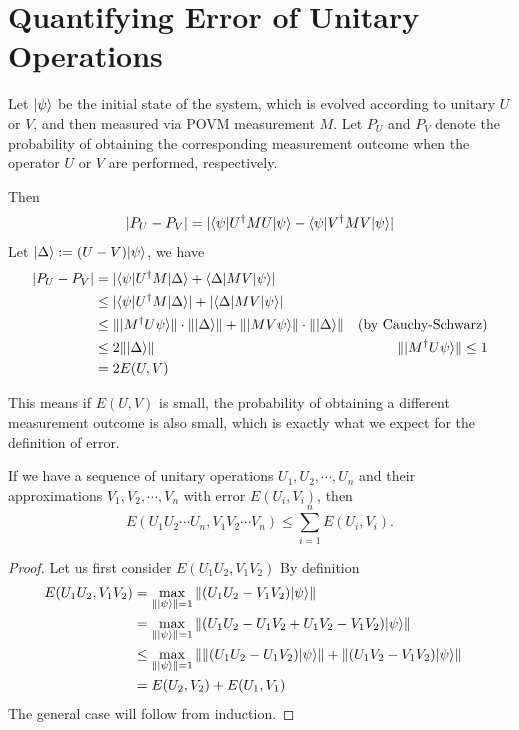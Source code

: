 \section{Quantifying Error of Unitary Operations}\label{sec:error}

\begin{remark}
	Let $|\psi\rangle$ be the initial state of the system, which is evolved according to unitary $U$ or $V$, and then measured via POVM measurement $M$. 
	Let $P_U$ and $P_V$ denote the probability of obtaining the corresponding measurement outcome when the operator $U$ or $V$ are performed, respectively. 

	Then 
	$$
	|P_U - P_V| = | \langle\psi| U^\dagger M U |\psi\rangle - \langle\psi| V^\dagger M V |\psi\rangle |
	$$
	Let $|\Delta\rangle := (U - V)|\psi\rangle$, we have 
	\begin{align*}
		|P_U - P_V| 
		& = | \langle\psi| U^\dagger M |\Delta\rangle + \langle\Delta| M V |\psi\rangle | & \\
		&\leq | \langle\psi| U^\dagger M |\Delta\rangle | + |\langle\Delta| M V |\psi\rangle | &\\
		& \leq \| |M^\dagger U \psi\rangle \| \cdot \| |\Delta\rangle \| + \| |M V \psi\rangle \| \cdot \| |\Delta\rangle \|  & \text{(by Cauchy-Schwarz)}\\ 
		& \leq 2 \| |\Delta\rangle \| &  \| |M^\dagger U \psi\rangle\| \leq 1\\
		& = 2 E(U, V) &
	\end{align*}

	This means if $E(U, V)$ is small, the probability of obtaining a different measurement outcome is also small, which is exactly what we expect for the definition of error.
\end{remark}

\begin{proposition}\label{prop:cumulation-of-error}
	If we have a sequence of unitary operations $U_1, U_2, \cdots, U_n$ and their approximations $V_1, V_2, \cdots, V_n$ with error $E(U_i, V_i)$, then 
	$$
	E(U_1 U_2 \cdots U_n, V_1 V_2 \cdots V_n) \leq \sum_{i=1}^n E(U_i, V_i).
	$$
\end{proposition}

\begin{proof}
	Let us first consider $E(U_1U_2, V_1V_2)$
	By definition
\begin{align*}
	E(U_1U_2, V_1V_2) 
	& = \max_{\||\psi\rangle\| = 1} \| (U_1 U_2 - V_1 V_2) |\psi\rangle \|&\\
	& = \max_{\||\psi\rangle\| = 1} \| (U_1 U_2 - U_1 V_2 + U_1 V_2 - V_1 V_2) |\psi\rangle \| &\\
	& \leq \max_{\||\psi\rangle\| = 1} \| \| (U_1 U_2 - U_1 V_2) |\psi\rangle \| + \| (U_1 V_2 - V_1 V_2) |\psi\rangle \| & \\
	& = E(U_2, V_2) + E(U_1, V_1) &
\end{align*}
The general case will follow from induction.
\end{proof}

